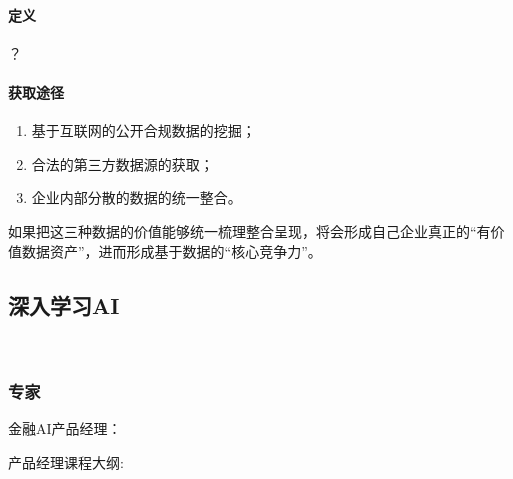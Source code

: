 \documentclass[letterpaper,11pt,english]{sphinxmanual}
\begin{document}
\paragraph{定义}
\label{\detokenize{chapter_data_dive/compliance_data:id2}}
？


\paragraph{获取途径}
\label{\detokenize{chapter_data_dive/compliance_data:id3}}\begin{enumerate}
%
\item {} 
基于互联网的公开合规数据的挖掘；

\item {} 
合法的第三方数据源的获取；

\item {} 
企业内部分散的数据的统一整合。

\end{enumerate}

如果把这三种数据的价值能够统一梳理整合呈现，将会形成自己企业真正的“有价值数据资产”，进而形成基于数据的“核心竞争力”。%
\begin{footnote}[817]\sphinxAtStartFootnote
{}
%
\end{footnote}


\subsection{深入学习AI}
\label{\detokenize{chapter_AI_dive/index:ai}}\label{\detokenize{chapter_AI_dive/index:chap-ai-dive}}\label{\detokenize{chapter_AI_dive/index::doc}}
​


\subsubsection{专家}
\label{\detokenize{chapter_AI_dive/expert:id1}}\label{\detokenize{chapter_AI_dive/expert::doc}}

金融AI产品经理： 

产品经理课程大纲: 

\end{document}
